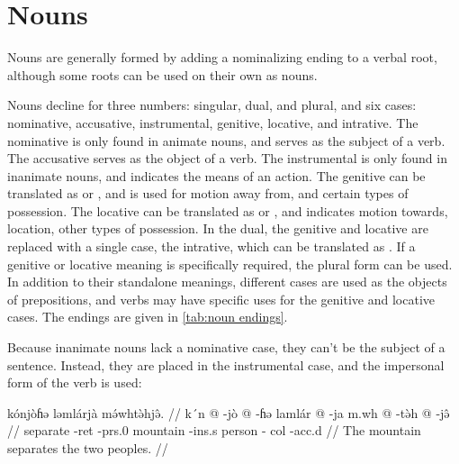 \section{Nouns}

Nouns are generally formed by adding a nominalizing ending to a verbal root,
although some roots can be used on their own as nouns.

Nouns decline for three numbers: singular, dual, and plural, and six cases:
nominative, accusative, instrumental, genitive, locative, and intrative. The
nominative is only found in animate nouns, and serves as the subject of a verb.
The accusative serves as the object of a verb. The instrumental is only found
in inanimate nouns, and indicates the means of an action. The genitive can be
translated as  or , and is used for motion away from, and
certain types of possession. The locative can be translated as  or
, and indicates motion towards, location, other types of possession. In
the dual, the genitive and locative are replaced with a single case, the
intrative, which can be translated as . If a genitive or locative
meaning is specifically required, the plural form can be used. In addition to
their standalone meanings, different cases are used as the objects of
prepositions, and verbs may have specific uses for the genitive and locative
cases. The endings are given in \cref{tab:noun endings}.

Because inanimate nouns lack a nominative case, they can't be the subject of a
sentence. Instead, they are placed in the instrumental case, and the impersonal
form of the verb is used:

\ex
\begingl
    \glpreamble kónjòɦə ləmlárjà mə́whtə̀hjə̂. //
    \gla k´n @ -jò @ -ɦə lamlár @ -ja m.wh @ -tə̀h @ -jə̂ //
    \glb separate -{\sc ret} -{\sc prs}.0 mountain -{\sc ins}.s person -{\sc
        col} -{\sc acc}.d //
    \glft The mountain separates the two peoples. //
\endgl
\xe

